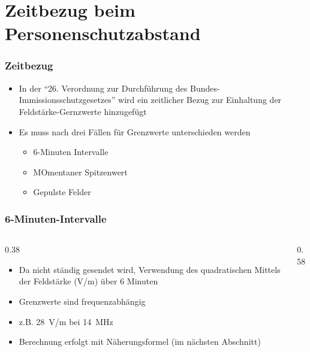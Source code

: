 
\section{Zeitbezug beim Personenschutzabstand}
\label{section:personenschutzabstand_zeitbezug}
\begin{frame}%
    \frametitle{Zeitbezug}
    \begin{itemize}
        \item In der \enquote{26. Verordnung zur Durchführung des Bundes-Immissionsschutzgesetzes} wird ein zeitlicher Bezug zur Einhaltung der Feldstärke-Gernzwerte hinzugefügt
        \item Es muss nach drei Fällen für Grenzwerte unterschieden werden
        \begin{itemize}
            \item 6-Minuten Intervalle
            \item MOmentaner Spitzenwert
            \item Gepulste Felder
        \end{itemize}
    \end{itemize}
\end{frame}

\begin{frame}
    \frametitle{6-Minuten-Intervalle}
    \begin{columns}
        \begin{column}{0.38\linewidth}
            \begin{itemize}
                \item Da nicht ständig gesendet wird, Verwendung des quadratischen Mittels der Feldstärke (V/m) über 6 Minuten
                \item Grenzwerte sind frequenzabhängig
                \item z.B. \qty{28}{\volt}/m bei \qty{14}{\mega\hertz}
                \item Berechnung erfolgt mit Näherungsformel (im nächsten Abschnitt)
            \end{itemize}
        \end{column}
        \begin{column}{0.58\linewidth}
        \end{column}
    \end{columns}
\end{frame}

